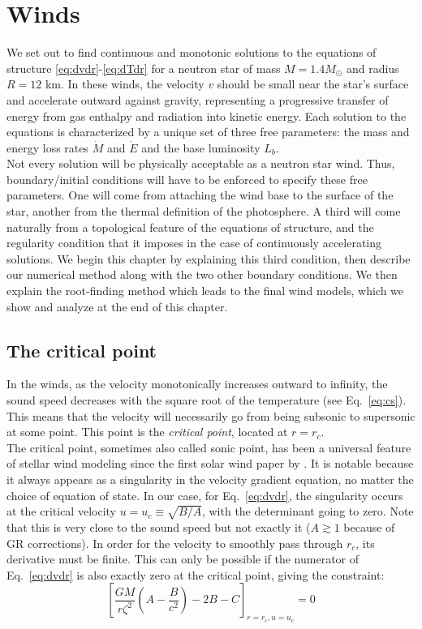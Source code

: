 \documentclass[../main.tex]{subfiles}
\newcommand{\Mdot}{\dot{M}}
\newcommand{\Edot}{\dot{E}}
\begin{document}
\section{Winds}

We set out to find continuous and monotonic solutions to the equations of structure \eqref{eq:dvdr}-\eqref{eq:dTdr} for a neutron star of mass $M=1.4M_\odot$ and radius $R=12$ km. In these winds, the velocity $v$ should be small near the star's surface and accelerate outward against gravity, representing a progressive transfer of energy from gas enthalpy and radiation into kinetic energy.  Each solution to the equations is characterized by a unique set of three free parameters: the mass and energy loss rates $\Mdot$ and $\Edot$ and the base luminosity $L_b$. \\

Not every solution will be physically acceptable as a neutron star wind. Thus, boundary/initial conditions will have to be enforced to specify these free parameters. One will come from attaching the wind base to the surface of the star, another from the thermal definition of the photosphere. A third will come naturally from a topological feature of the equations of structure, and the regularity condition that it imposes in the case of continuously accelerating solutions. We begin this chapter by explaining this third condition, then describe our numerical method along with the two other boundary conditions. We then explain the root-finding method which leads to the final wind models, which we show and analyze at the end of this chapter.

\subsection{The critical point}
In the winds, as the velocity monotonically increases outward to infinity, the sound speed decreases with the square root of the temperature (see Eq.~\ref{eq:cs}). This means that the velocity will necessarily go from being subsonic to supersonic at some point. This point is the \textit{critical point}, located at $r=r_c$. \\

The critical point, sometimes also called sonic point, has been a universal feature of stellar wind modeling since the first solar wind paper by \citet{Parker1958}. It is notable because it always appears as a singularity in the velocity gradient equation, no matter the choice of equation of state. In our case, for Eq.~\eqref{eq:dvdr}, the singularity occurs at the critical velocity $u=u_c\equiv \sqrt{B/A}$, with the determinant going to zero. Note that this is very close to the sound speed but not exactly it ($A\gtrsim 1$ because of GR corrections). In order for the velocity to smoothly pass through $r_c$, its derivative must be finite. This can only be possible if the numerator of Eq.~\eqref{eq:dvdr} is also exactly zero at the critical point, giving the constraint:
\begin{equation}\label{eq:regularity_constraint}
    \left[\frac{GM}{r\zeta^2}\left(A-\frac{B}{c^2}\right)-2B-C\right]_{r=r_c,u=u_c}=0
\end{equation}
\end{document}
